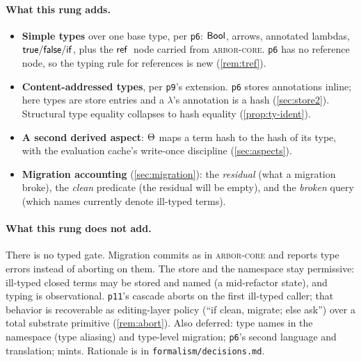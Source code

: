 \documentclass[11pt]{article}
\theoremstyle{definition}
\theoremstyle{plain}
\theoremstyle{remark}
\newcommand{\arborcore}{\textsc{arbor-core}}
\begin{document}
\paragraph{What this rung adds.}
\begin{itemize}[nosep]
  \item \textbf{Simple types} over one base type, per \texttt{p6}: $\mathsf{Bool}$, arrows,
  annotated lambdas, $\mathsf{true}/\mathsf{false}/\mathsf{if}$, plus the $\mathsf{ref}\,$ node carried from
  \arborcore{}. \texttt{p6} has no reference node, so the typing rule for references is new
  (\cref{rem:tref}).
  \item \textbf{Content-addressed types}, per \texttt{p9}'s extension. \texttt{p6} stores
  annotations inline; here types are store entries and a $\lambda$'s annotation is a hash
  (\cref{sec:store2}). Structural type equality collapses to hash equality
  (\cref{prop:ty-ident}).
  \item \textbf{A second derived aspect}: $\Theta$ maps a term hash to the hash of its type,
  with the evaluation cache's write-once discipline (\cref{sec:aspects}).
  \item \textbf{Migration accounting} (\cref{sec:migration}): the \emph{residual} (what a
  migration broke), the \emph{clean} predicate (the residual will be empty), and the
  \emph{broken} query (which names currently denote ill-typed terms).
\end{itemize}

\paragraph{What this rung does not add.} There is no typed gate. Migration commits as in
\arborcore{} and reports type errors instead of aborting on them. The store and the namespace
stay permissive: ill-typed closed terms may be stored and named (a mid-refactor state), and
typing is observational. \texttt{p11}'s cascade aborts on the first ill-typed caller; that
behavior is recoverable as editing-layer policy (``if clean, migrate; else ask'') over a total
substrate primitive (\cref{rem:abort}). Also deferred: type names in the namespace (type
aliasing) and type-level migration; \texttt{p6}'s second language and translation; mints.
Rationale is in \texttt{formalism/decisions.md}.
\end{document}
